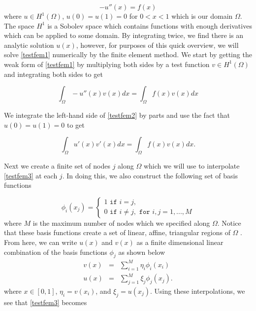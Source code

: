 \documentclass[a4paper]{article}
\theoremstyle{remark}
\theoremstyle{remark}
\begin{document}
\begin{equation}\label{testfem1}
-u'' \left(x \right)=f\left(x \right)
\end{equation}
where $u \in H^{1}\left(\Omega \right)$, $u\left(0 \right) = u\left(1 \right) = 0$ for $0<x<1$ which is our domain $\Omega$. The space $H^{1}$ is a Sobolev space which contains functions with enough derivatives which can be applied to some domain. By integrating twice, we find there is an analytic solution $u(x)$, however, for purposes of this quick overview, we will solve \eqref{testfem1} numerically by the finite element method. We start by getting the weak form of \eqref{testfem1} by multiplying both sides by a test function $v\in H^{1}\left(\Omega \right)$ and integrating both sides to get

\begin{equation}\label{testfem2}
\int_{\Omega} -u'' \left(x \right) v\left(x \right) dx=\int_{\Omega} f\left(x \right) v\left(x \right) dx
\end{equation}

\noindent We integrate the left-hand side of \eqref{testfem2} by parts and use the fact that $u\left(0 \right) = u\left(1 \right) = 0$ to get

\begin{equation}\label{testfem3}
\int_{\Omega} u' \left(x \right) v'\left(x \right) dx=\int_{\Omega} f\left(x \right) v\left(x \right) dx.
\end{equation}

\noindent Next we create a finite set of nodes $j$ along $\Omega$ which we will use to interpolate \eqref{testfem3} at each $j$. In doing this, we also construct the following set of basis functions

$$
\phi_{i}\left(x_{j} \right)=
\begin{cases}
1 \texttt{ if } i=j,\\
0 \texttt{ if } i\neq j, \texttt{ for } i,j=1,...,M
\end{cases}
$$
where $M$ is the maximum number of nodes which we specified along $\Omega$. Notice that these basis functions create a set of linear, affine, triangular regions of $\Omega$ \cite{50LinesofMATLAB}. From here, we can write $u\left(x\right)$ and $v\left(x\right)$ as a finite dimensional linear combination of the basis functions $\phi_{j}$ \cite{Sullivan} as shown below
\begin{eqnarray}\label{UVdiscrete}
v\left(x \right) &=& \sum_{i=1}^{M} \eta_{i} \phi_{i}\left(x_{i} \right)\\
\nonumber
u\left(x \right) &=& \sum_{j=1}^{M} \xi_{j} \phi_{j}\left(x_{j} \right).
\end{eqnarray}
where $x \in [0,1]$, $\eta_{i}=v\left(x_{i}\right)$, and $\xi_{j}=u\left(x_{j}\right)$. Using these interpolations, we see that \ref{testfem3} becomes
\end{document}
